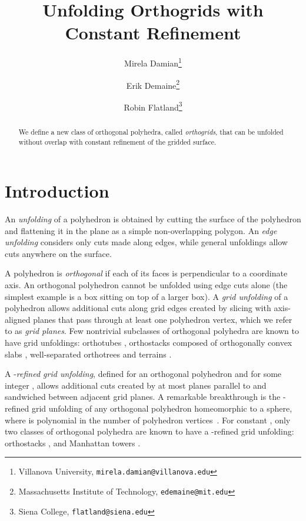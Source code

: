 \documentclass[11pt]{article}
\begin{document}
\title{Unfolding Orthogrids with Constant Refinement}
\author{
Mirela Damian\thanks{Villanova University, \tt{mirela.damian@villanova.edu}}
\and
Erik Demaine\thanks{Massachusetts Institute of Technology,  \tt{edemaine@mit.edu}}
\and
Robin Flatland\thanks{Siena College, \tt{flatland@siena.edu}}
}
\date{}
\maketitle


\begin{abstract}
We define a new class of orthogonal polyhedra, called \emph{orthogrids}, that can be unfolded without overlap with constant refinement of the gridded surface. 
\end{abstract}

\section{Introduction}
An \emph{unfolding} of a polyhedron is obtained by cutting the surface of the polyhedron and flattening it in the plane 
as a simple non-overlapping polygon. 
An \emph{edge unfolding} considers only cuts made along edges, while general unfoldings allow cuts anywhere on the surface. 

A polyhedron is \emph{orthogonal} if each of its faces is perpendicular to a coordinate axis.
An orthogonal polyhedron cannot be unfolded using edge cuts alone 
(the simplest example is a box sitting on top of a larger box). 
A \emph{grid unfolding} of a polyhedron  allows additional cuts along grid edges created by slicing  with 
axis-aligned planes that pass through at least one polyhedron vertex, which we refer to as \emph{grid planes}. Few nontrivial subclasses of orthogonal polyhedra are known to have grid unfoldings: orthotubes
\cite{Biedl-Demaine-Demaine-Lubiw-Overmars-O'Rourke-Robbins-Whitesides-1998},
orthostacks composed of orthogonally convex slabs
\cite{Damian-Meijer-2004-orthostacks}, 
well-separated orthotrees 
\cite{Damian-Flatland-Meijer-O'Rourke-2005-orthotrees} and
terrains
\cite{O'Rourke-2007-terrains}.

A -\emph{refined grid unfolding}, defined for an orthogonal polyhedron and for some integer , allows additional cuts created by at most  planes parallel to and sandwiched between adjacent grid planes. 
A remarkable breakthrough is the -refined grid unfolding of any orthogonal polyhedron homeomorphic to a sphere, where  is polynomial in the number of polyhedron vertices~\cite{Damian-Demaine-Flatland-2012-epsilon}.
For constant , only two  classes of orthogonal polyhedra are known to have a -refined grid unfolding: orthostacks
\cite{Biedl-Demaine-Demaine-Lubiw-Overmars-O'Rourke-Robbins-Whitesides-1998},
and Manhattan towers \cite{Damian-Flatland-O'Rourke-2008-manhattan}. 
\end{document}
